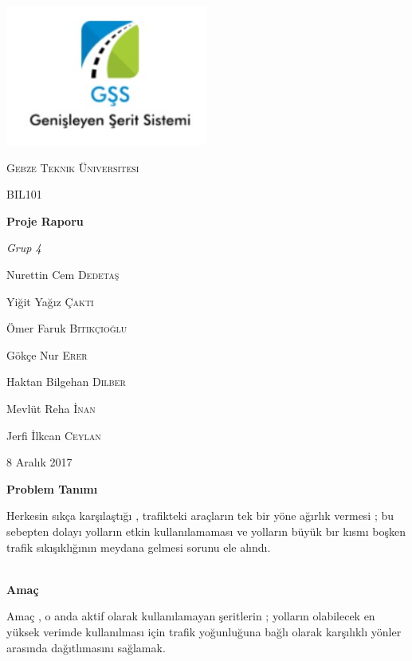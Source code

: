 \documentclass[12pt,a4paper]{report}
\begin{document}
	\begin{titlepage}
		\centering
		\shorthandoff{=}
		\includegraphics[width=0.5\textwidth]{logo.jpeg}\par\vspace{1cm}
		{\scshape\LARGE Gebze Teknik Üniversitesi \par}
		\vspace{1cm}
		{\scshape\Large BIL101\par}
		\vspace{1.5cm}
		{\huge\bfseries Proje Raporu\par}
		\vspace{2cm}
		{\Large\itshape Grup 4\par}
		\vfill
		Nurettin Cem \textsc{Dedetaş}\par
		Yiğit Yağız \textsc{Çaktı}\par
		Ömer Faruk \textsc{Bitikçioğlu}\par
		Gökçe Nur \textsc{Erer}\par
		Haktan Bilgehan \textsc{Dilber}\par
		Mevlüt Reha \textsc{İnan}\par
		Jerfi İlkcan \textsc{Ceylan}
		\vfill
	
		{\large 8 Aralık 2017\par}
	\end{titlepage}

{\Large\bfseries Problem Tanımı \\ \par}

Herkesin sıkça karşılaştığı , trafikteki araçların tek bir yöne ağırlık vermesi ; bu sebepten dolayı yolların etkin kullanılamaması ve yolların büyük bır kısmı boşken trafik sıkışıklığının meydana gelmesi sorunu ele alındı. \\ \\

{\Large\bfseries Amaç \\ \par} 
Amaç , o anda aktif olarak kullanılamayan şeritlerin ; yolların olabilecek en yüksek verimde kullanılması için trafik yoğunluğuna bağlı olarak karşılıklı yönler arasında dağıtlımasını sağlamak. \\ \\
\end{document}
